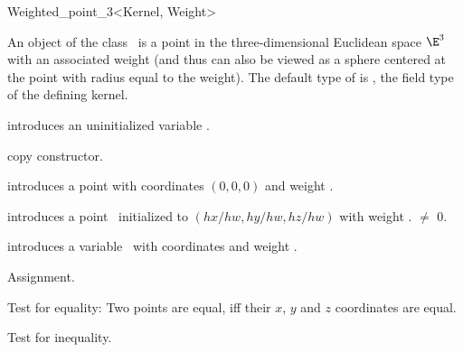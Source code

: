 \begin{ccRefClass} {Weighted_point_3<Kernel, Weight>}

\ccDefinition
An object of the class \ccRefName\ is a point in the three-dimensional
Euclidean space $\E^3$ with an associated weight (and thus can also be 
viewed as a sphere centered at the point with radius equal to the weight). 
The default type of  is , the
field type of the defining kernel.

\ccInheritsFrom
{}

\ccTypes


\ccCreation
{}


\ccHidden {}
             {introduces an uninitialized variable \ccVar.}

\ccHidden {}
            {copy constructor.}

            {introduces a point with  
             coordinates $(0,0,0)$ and weight .}

            {introduces a point \ccVar\ initialized to $(hx/hw,hy/hw, hz/hw)$
             with weight .
             \ccPrecond {} $\neq$ 0.}

            {introduces a variable \ccVar\ with 
             coordinates  and weight .}

\ccOperations

\ccHidden {}
        {Assignment.}

       {Test for equality: Two points are equal, iff their $x$, $y$ and $z$
        coordinates are equal.}

       {Test for inequality.}


\end{ccRefClass}
